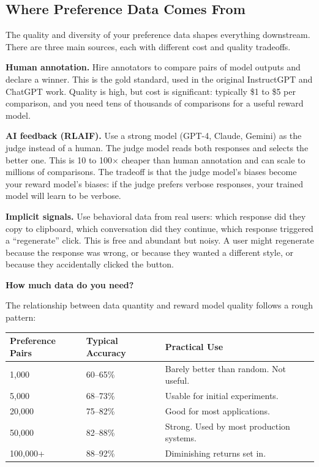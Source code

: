 \begin{chapterenv}
\subsection{Where Preference Data Comes From}

The quality and diversity of your preference data shapes everything downstream. There are three main sources, each with different cost and quality tradeoffs.

\textbf{Human annotation.} Hire annotators to compare pairs of model outputs and declare a winner. This is the gold standard, used in the original InstructGPT and ChatGPT work. Quality is high, but cost is significant: typically \$1 to \$5 per comparison, and you need tens of thousands of comparisons for a useful reward model.

\textbf{AI feedback (RLAIF).} Use a strong model (GPT-4, Claude, Gemini) as the judge instead of a human. The judge model reads both responses and selects the better one. This is 10 to 100$\times$ cheaper than human annotation and can scale to millions of comparisons. The tradeoff is that the judge model's biases become your reward model's biases: if the judge prefers verbose responses, your trained model will learn to be verbose.

\textbf{Implicit signals.} Use behavioral data from real users: which response did they copy to clipboard, which conversation did they continue, which response triggered a ``regenerate'' click. This is free and abundant but noisy. A user might regenerate because the response was wrong, or because they wanted a different style, or because they accidentally clicked the button.

\begin{infobox}
\textbf{How much data do you need?}

The relationship between data quantity and reward model quality follows a rough pattern:

\begin{center}
\begin{tabular}{p{}p{}p{}}
\toprule
\textbf{Preference Pairs} & \textbf{Typical Accuracy} & \textbf{Practical Use} \\
\midrule
1,000 & 60--65\% & Barely better than random. Not useful. \\
5,000 & 68--73\% & Usable for initial experiments. \\
20,000 & 75--82\% & Good for most applications. \\
50,000 & 82--88\% & Strong. Used by most production systems. \\
100,000+ & 88--92\% & Diminishing returns set in. \\
\bottomrule
\end{tabular}
\end{center}


\end{infobox}
\end{chapterenv}
